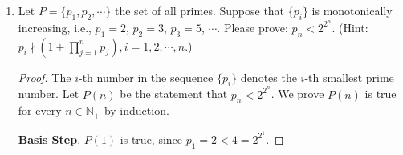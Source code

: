 \documentclass[12pt,a4paper]{article}
\theoremstyle{definition}
\begin{document}
\begin{enumerate}
\begin{proof}
        Since $4 \times 1 + 7 \times 2 = 18$, $4 \times 3 + 7 \times 1 = 19$ and $4 \times 5 + 7 \times 0 = 20$, we have $P(18)$, $P(19)$ and $P(20)$ are true and $k - 3 > 17$.

        Since $k$ is the smallest value for which $P(k)$ false, $P(k-1)$ true. Thus $P(k-3)$ is true, that is, $\exists i_{k-3} \ge 0$ and $j_{k-3} \ge 0$, such that $k - 3 = i_{k-3} \times 4 + j_{k-1} \times 7$.

        \begin{itemize}
            \item If $i_{k-3} > 0$, then there exist $i_k = i_{k-3} - 1 \geq 0, j_k = j_{k-3} + 1 \geq 0$,
            \begin{displaymath}
                k = i_{k-3} \times 4 + j_{k-3} \times 7 + 3 = (i_{k-3} - 1) \times 4 + (j_{k-3} + 1) \times 7 = i_k \times 4 + j_k \times 7
            \end{displaymath}
            \item If $i_{k-3} = 0$, then $7 | (k - 3)$. Owing to $k - 3 > 17$ we have $j_{k-3} \ge 3$. Thus there exist $i_k = 6 \ge 0, j_k = j_{k-3}-3 \ge 0$,
            \begin{displaymath}
                k = j_{k-3} \times 7 + 3 = 6 \times 4 + (j_{k-3} - 3) \times 7 = i_k \times 4 + j_k \times 7
            \end{displaymath}
        \end{itemize}

        In conclusion, there exist $i_k \ge 0$ and $j_k \ge 0$ that $k = i_k \times 4 + j_k \times 7$. We have derived a contradiction, which allows us to conclude that our original assumption is false, which means $P(n)$ is true for $n > 17$.
    \end{proof}

    \item
    Let $P=\{p_1, p_2, \cdots\}$ the set of all primes. Suppose that $\{p_i\}$ is monotonically increasing, i.e., $p_1=2$, $p_2=3$, $p_3=5$, $\cdots$. Please prove: $p_n<2^{2^n}$. {\color{blue}(Hint: $p_i \nmid (1+\prod_{j=1}^n p_j), i=1,2,\cdots,n$.)}
    \begin{proof}
        The $i$-th number in the sequence $\{p_i\}$ denotes the $i$-th smallest prime number. Let $P(n)$ be the statement that $p_n < 2^{2^n}$. We prove $P(n)$ is true for every $n \in \mathbb{N}_+$ by induction.

        \textbf{\color{blue}Basis Step}. $P(1)$ is true, since $p_1 = 2 < 4 = 2^{2^1}$.


\end{proof}
\end{enumerate}
\end{document}

